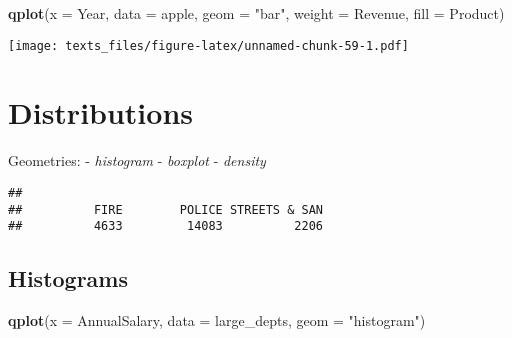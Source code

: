 \documentclass[]{book}
\newenvironment{Shaded}{\begin{snugshade}}{\end{snugshade}}
\newcommand{\DataTypeTok}[1]{\textcolor[rgb]{0.13,0.29,0.53}{#1}}
\newcommand{\KeywordTok}[1]{\textcolor[rgb]{0.13,0.29,0.53}{\textbf{#1}}}
\newcommand{\NormalTok}[1]{#1}
\newcommand{\OperatorTok}[1]{\textcolor[rgb]{0.81,0.36,0.00}{\textbf{#1}}}
\newcommand{\StringTok}[1]{\textcolor[rgb]{0.31,0.60,0.02}{#1}}
\begin{document}
\begin{Shaded}
\begin{Highlighting}[]
\KeywordTok{qplot}\NormalTok{(}\DataTypeTok{x =}\NormalTok{ Year, }\DataTypeTok{data =}\NormalTok{ apple, }\DataTypeTok{geom =} \StringTok{"bar"}\NormalTok{, }\DataTypeTok{weight =}\NormalTok{ Revenue, }\DataTypeTok{fill =}\NormalTok{ Product)}
\end{Highlighting}
\end{Shaded}

\texttt{[image: texts\_files/figure-latex/unnamed-chunk-59-1.pdf]}

\hypertarget{plotdistributions}{%
\section*{Distributions}\label{plotdistributions}}

Geometries:
- \emph{histogram}
- \emph{boxplot}
- \emph{density}

\begin{Shaded}
\end{Shaded}

\begin{verbatim}
## 
##          FIRE        POLICE STREETS & SAN 
##          4633         14083          2206
\end{verbatim}

\hypertarget{qplothist}{%
\subsection*{Histograms}\label{qplothist}}

\begin{Shaded}
\begin{Highlighting}[]
\KeywordTok{qplot}\NormalTok{(}\DataTypeTok{x =}\NormalTok{ AnnualSalary, }\DataTypeTok{data =}\NormalTok{ large_depts, }\DataTypeTok{geom =} \StringTok{"histogram"}\NormalTok{) }
\end{Highlighting}
\end{Shaded}
\end{document}
